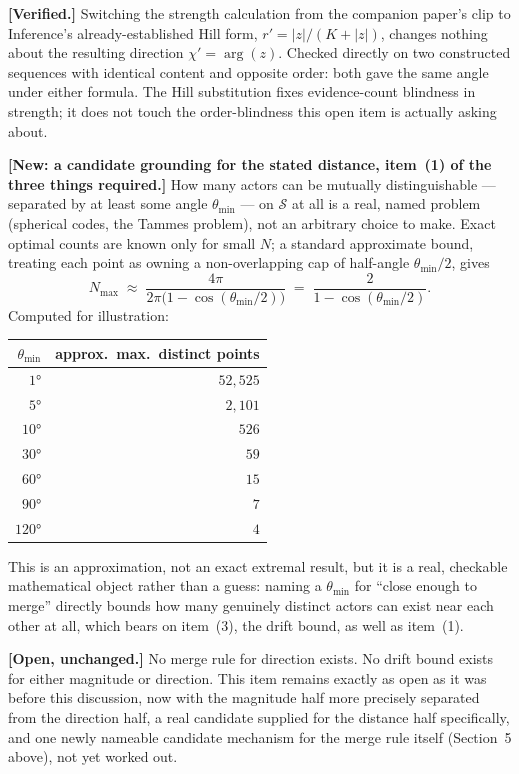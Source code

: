 \documentclass[11pt]{article}
\begin{document}
\textbf{[Verified.]} Switching the strength calculation from the
companion paper's clip to Inference's already-established Hill form,
$r'=|z|/(K+|z|)$, changes nothing about the resulting direction
$\chi'=\arg(z)$. Checked directly on two constructed sequences with
identical content and opposite order: both gave the same angle under
either formula. The Hill substitution fixes evidence-count blindness
in strength; it does not touch the order-blindness this open item is
actually asking about.

\textbf{[New: a candidate grounding for the stated distance,
item~(1) of the three things required.]} How many actors can be
mutually distinguishable --- separated by at least some angle
$\theta_{\min}$ --- on $\mathcal{S}$ at all is a real, named problem
(spherical codes, the Tammes problem), not an arbitrary choice to
make. Exact optimal counts are known only for small $N$; a standard
approximate bound, treating each point as owning a non-overlapping
cap of half-angle $\theta_{\min}/2$, gives
\[
N_{\max} \;\approx\; \frac{4\pi}{2\pi\bigl(1-\cos(\theta_{\min}/2)\bigr)}
\;=\; \frac{2}{1-\cos(\theta_{\min}/2)}.
\]
Computed for illustration:
\begin{center}
\begin{tabular}{rr}
$\theta_{\min}$ & approx.\ max.\ distinct points \\
\hline
$1°$   & $52{,}525$ \\
$5°$   & $2{,}101$ \\
$10°$  & $526$ \\
$30°$  & $59$ \\
$60°$  & $15$ \\
$90°$  & $7$ \\
$120°$ & $4$ \\
\end{tabular}
\end{center}
This is an approximation, not an exact extremal result, but it is a
real, checkable mathematical object rather than a guess: naming a
$\theta_{\min}$ for ``close enough to merge'' directly bounds how many
genuinely distinct actors can exist near each other at all, which
bears on item~(3), the drift bound, as well as item~(1).

\textbf{[Open, unchanged.]} No merge rule for direction exists. No
drift bound exists for either magnitude or direction. This item
remains exactly as open as it was before this discussion, now with
the magnitude half more precisely separated from the direction half,
a real candidate supplied for the distance half specifically, and one
newly nameable candidate mechanism for the merge rule itself
(Section~5 above), not yet worked out.
\end{document}
